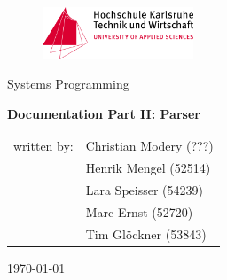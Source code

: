 \begin{titlepage}
	\begin{figure}					
		\includegraphics[width=0.4\textwidth, right]{./Bildmaterial/Logos/hska_logo.png}
		\captionsetup{labelformat=empty}
		\caption[Logo of the University of Applied Sciences Karlsruhe]{}		
		\vspace{1.5cm}
	\end{figure}\par
	\centering
	{
		{\LARGE Systems Programming\\}
	}\par

	\vspace{3.0cm}
	{\LARGE \textbf{Documentation Part II: Parser}}
	\par
	
	\vspace{3.0cm}
	{
		\begin{tabular}[h!]{ll}
			written by: & Christian Modery (???)\\[0.6cm]
			& Henrik Mengel (52514)\\[0.6cm]
			& Lara Speisser (54239)\\[0.6cm]
			& Marc Ernst (52720)\\[0.6cm]
			& Tim Glöckner (53843)\\[0.6cm]
		\end{tabular}
	}
	\vfill
	{\today\par}
\end{titlepage}	